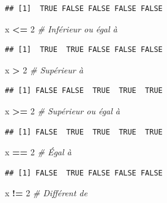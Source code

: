 \documentclass[
  11pt,
]{book}
\newenvironment{Shaded}{\begin{snugshade}}{\end{snugshade}}
\newcommand{\CommentTok}[1]{\textcolor[rgb]{0.56,0.35,0.01}{\textit{#1}}}
\newcommand{\DecValTok}[1]{\textcolor[rgb]{0.00,0.00,0.81}{#1}}
\newcommand{\NormalTok}[1]{#1}
\newcommand{\OperatorTok}[1]{\textcolor[rgb]{0.81,0.36,0.00}{\textbf{#1}}}
\newcommand{\StringTok}[1]{\textcolor[rgb]{0.31,0.60,0.02}{#1}}
\numberwithin{equation}{section}
\numberwithin{countremarque}{section}
\begin{document}
\begin{lstlisting}
## [1]  TRUE FALSE FALSE FALSE FALSE
\end{lstlisting}

\begin{Shaded}
\begin{Highlighting}[]
\NormalTok{x }\OperatorTok{\textless{}=}\StringTok{ }\DecValTok{2}  \CommentTok{\# Inférieur ou égal à}
\end{Highlighting}
\end{Shaded}

\begin{lstlisting}
## [1]  TRUE  TRUE FALSE FALSE FALSE
\end{lstlisting}

\begin{Shaded}
\begin{Highlighting}[]
\NormalTok{x }\OperatorTok{\textgreater{}}\StringTok{ }\DecValTok{2}   \CommentTok{\# Supérieur à}
\end{Highlighting}
\end{Shaded}

\begin{lstlisting}
## [1] FALSE FALSE  TRUE  TRUE  TRUE
\end{lstlisting}

\begin{Shaded}
\begin{Highlighting}[]
\NormalTok{x }\OperatorTok{\textgreater{}=}\StringTok{ }\DecValTok{2}  \CommentTok{\# Supérieur ou égal à}
\end{Highlighting}
\end{Shaded}

\begin{lstlisting}
## [1] FALSE  TRUE  TRUE  TRUE  TRUE
\end{lstlisting}

\begin{Shaded}
\begin{Highlighting}[]
\NormalTok{x }\OperatorTok{==}\StringTok{ }\DecValTok{2}  \CommentTok{\# Égal à}
\end{Highlighting}
\end{Shaded}

\begin{lstlisting}
## [1] FALSE  TRUE FALSE FALSE FALSE
\end{lstlisting}

\begin{Shaded}
\begin{Highlighting}[]
\NormalTok{x }\OperatorTok{!=}\StringTok{ }\DecValTok{2}  \CommentTok{\# Différent de}
\end{Highlighting}
\end{Shaded}
\end{document}

